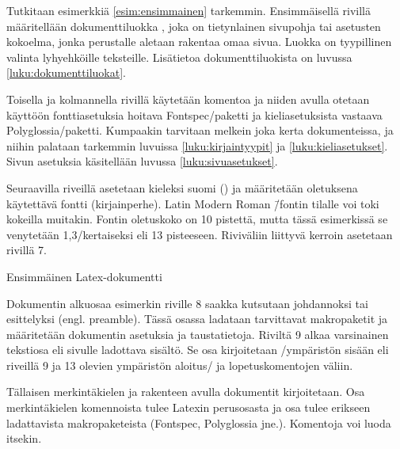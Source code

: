 Tutkitaan esimerkkiä \ref{esim:ensimmainen} tarkemmin. Ensimmäisellä
rivillä määritellään dokumenttiluokka \textenglish{},
joka on tietynlainen sivupohja tai asetusten kokoelma, jonka perustalle
aletaan rakentaa omaa sivua. Luokka \textenglish{} on
tyypillinen valinta lyhyehköille teksteille. Lisätietoa
dokumenttiluokista on luvussa \ref{luku:dokumenttiluokat}.

Toisella ja kolmannella rivillä käytetään komentoa  ja niiden avulla otetaan käyttöön fontti\-asetuksia
hoitava Fontspec\-/paketti ja kieli\-asetuksista vastaava
Polyglossia\-/paketti. Kumpaakin tarvitaan melkein joka kerta
dokumenteissa, ja niihin palataan tarkemmin luvuissa
\ref{luku:kirjaintyypit} ja \ref{luku:kieliasetukset}. Sivun asetuksia
käsitellään luvussa \ref{luku:sivuasetukset}.

Seuraavilla riveillä asetetaan kieleksi suomi () ja
määritetään oletuksena käytettävä fontti (kirjainperhe). Latin Modern
Roman \=/fontin tilalle voi toki kokeilla muitakin. Fontin oletuskoko on
10 pistettä, mutta tässä esimerkissä se venytetään 1,3\-/kertaiseksi eli
13 pisteeseen. Riviväliin liittyvä kerroin asetetaan rivillä 7.

\begin{esimerkki}
\caption{Ensimmäinen Latex-dokumentti}
\label{esim:ensimmainen}
\end{esimerkki}

Dokumentin alku\-osaa esimerkin riville 8 saakka kutsutaan johdannoksi
tai esittelyksi (engl. \textenglish{preamble}). Tässä osassa ladataan
tarvittavat makropaketit ja määritetään dokumentin asetuksia ja
taustatietoja. Riviltä 9 alkaa varsinainen teksti\-osa eli sivulle
ladottava sisältö. Se osa kirjoitetaan \-/ympäristön
sisään eli riveillä 9 ja 13 olevien ympäristön aloitus\-/{} ja
lopetuskomentojen väliin.

Tällaisen merkintäkielen ja rakenteen avulla dokumentit kirjoitetaan.
Osa merkintäkielen komennoista tulee Latexin perus\-osasta ja osa tulee
erikseen ladattavista makropaketeista (Fontspec, Polyglossia jne.).
Komentoja voi luoda itsekin.

